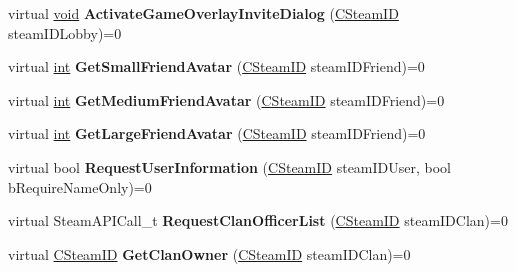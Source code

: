 \begin{DoxyCompactItemize}
\item 
\hypertarget{classISteamFriends_acabecb72f25302d9909519788d193f13}{}virtual \hyperlink{SDL__audio_8h_a52835ae37c4bb905b903cbaf5d04b05f}{void} {\bfseries Activate\+Game\+Overlay\+Invite\+Dialog} (\hyperlink{classCSteamID}{C\+Steam\+I\+D} steam\+I\+D\+Lobby)=0\label{classISteamFriends_acabecb72f25302d9909519788d193f13}

\item 
\hypertarget{classISteamFriends_afa940165783547227f489fea9b0623cf}{}virtual \hyperlink{SDL__thread_8h_a6a64f9be4433e4de6e2f2f548cf3c08e}{int} {\bfseries Get\+Small\+Friend\+Avatar} (\hyperlink{classCSteamID}{C\+Steam\+I\+D} steam\+I\+D\+Friend)=0\label{classISteamFriends_afa940165783547227f489fea9b0623cf}

\item 
\hypertarget{classISteamFriends_a16c65f939af9f28ff82e4920bf08b85b}{}virtual \hyperlink{SDL__thread_8h_a6a64f9be4433e4de6e2f2f548cf3c08e}{int} {\bfseries Get\+Medium\+Friend\+Avatar} (\hyperlink{classCSteamID}{C\+Steam\+I\+D} steam\+I\+D\+Friend)=0\label{classISteamFriends_a16c65f939af9f28ff82e4920bf08b85b}

\item 
\hypertarget{classISteamFriends_a63fc9433e7db6607e576a2337a92a35d}{}virtual \hyperlink{SDL__thread_8h_a6a64f9be4433e4de6e2f2f548cf3c08e}{int} {\bfseries Get\+Large\+Friend\+Avatar} (\hyperlink{classCSteamID}{C\+Steam\+I\+D} steam\+I\+D\+Friend)=0\label{classISteamFriends_a63fc9433e7db6607e576a2337a92a35d}

\item 
\hypertarget{classISteamFriends_a7361d0c70a8f3bfafef904f031ab2672}{}virtual bool {\bfseries Request\+User\+Information} (\hyperlink{classCSteamID}{C\+Steam\+I\+D} steam\+I\+D\+User, bool b\+Require\+Name\+Only)=0\label{classISteamFriends_a7361d0c70a8f3bfafef904f031ab2672}

\item 
\hypertarget{classISteamFriends_a86559d74486ea2615531b17ae0fed9d3}{}virtual Steam\+A\+P\+I\+Call\+\_\+t {\bfseries Request\+Clan\+Officer\+List} (\hyperlink{classCSteamID}{C\+Steam\+I\+D} steam\+I\+D\+Clan)=0\label{classISteamFriends_a86559d74486ea2615531b17ae0fed9d3}

\item 
\hypertarget{classISteamFriends_aa7dc090b7d3f5fe7091c0768df42e08a}{}virtual \hyperlink{classCSteamID}{C\+Steam\+I\+D} {\bfseries Get\+Clan\+Owner} (\hyperlink{classCSteamID}{C\+Steam\+I\+D} steam\+I\+D\+Clan)=0\label{classISteamFriends_aa7dc090b7d3f5fe7091c0768df42e08a}


\end{DoxyCompactItemize}
